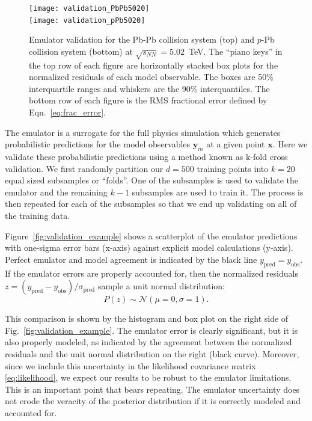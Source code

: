 \documentclass[aps,prc,reprint,amsmath,nofootinbib]{revtex4-1}
\newcommand{\sqrts}{\sqrt{s_{NN}}}
\newcommand{\x}{\mathbf x}
\newcommand{\y}{\mathbf y}
\begin{document}
\begin{figure}
  \texttt{[image: validation\_PbPb5020]}\\
  \texttt{[image: validation\_pPb5020]}
  \caption{
    \label{fig:validation_all}
    Emulator validation for the Pb-Pb collision system (top) and $p$-Pb collision system (bottom) at $\sqrts=5.02$~TeV.
    The ``piano keys'' in the top row of each figure are horizontally stacked box plots for the normalized residuals of each model observable.
    The boxes are 50\% interquartile ranges and whiskers are the 90\% interquantiles.
    The bottom row of each figure is the RMS fractional error defined by Eqn.~\eqref{eq:frac_error}.
  }
\end{figure}

The emulator is a surrogate for the full physics simulation which generates probabilistic predictions for the model observables $\y_m$ at a given point $\x$.
Here we validate these probabilistic predictions using a method known as k-fold cross validation.
We first randomly partition our $d=500$ training points into $k=20$ equal sized subsamples or ``folds''.
One of the subsamples is used to validate the emulator and the remaining $k-1$ subsamples are used to train it.
The process is then repeated for each of the subsamples so that we end up validating on all of the training data.

Figure~\ref{fig:validation_example} shows a scatterplot of the emulator predictions with one-sigma error bars (x-axis) against explicit model calculations (y-axis).
Perfect emulator and model agreement is indicated by the black line $y_\text{pred} = y_\text{obs}$.
If the emulator errors are properly accounted for, then the normalized residuals ${z=(y_\text{pred} - y_\text{obs})/\sigma_\text{pred}}$ sample a unit normal distribution:
\begin{equation}
  \label{eq:frac_error}
  P(z) \sim \mathcal{N}(\mu=0,\sigma=1).
\end{equation}

This comparison is shown by the histogram and box plot on the right side of Fig.~\ref{fig:validation_example}.
The emulator error is clearly significant, but it is also properly modeled, as indicated by the agreement between the normalized residuals and the unit normal distribution on the right (black curve).
Moreover, since we include this uncertainty in the likelihood covariance matrix \eqref{eq:likelihood}, we expect our results to be robust to the emulator limitations.
This is an important point that bears repeating.
The emulator uncertainty does not erode the veracity of the posterior distribution if it is correctly modeled and accounted for.
\end{document}
